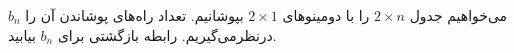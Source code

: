 \EXERCISE
می‌خواهیم جدول 
$2 \times n$
را با دومینوهای 
$2 \times 1$
بپوشانیم. تعداد راه‌های پوشاندن آن را 
$b_n$
 درنظرمی‌گیریم. رابطه
 بازگشتی برای 
$b_n$
  بیابید.
